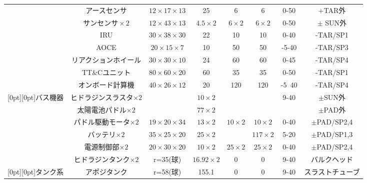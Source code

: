 \begin{table}[H]
\begin{tabularx}{55zw}{c|c c c C C C c }
  & アースセンサ & $12 \times 17 \times 13$ & 25 & 6 & 6 & 0-50 & +TAR外\\ 
  & $サンセンサ \times 2$ & $12 \times 43 \times 13$ & $4.5 \times 2$ & $6 \times 2$
  & $6 \times 2$ & 0-50 & $\pm$ SUN外\\ 
  & IRU & $30 \times 38 \times 30$ & 22 & 10 & 10 & 0-40 & -TAR/SP1\\ 
  & AOCE & $20 \times 15 \times 7$ & 10 & 50 & 50 & -5-40 & -TAR/SP3\\ 
  & リアクションホイール & $30 \times 30 \times 10$ & 24 & 60 & 60 & 0-45 & -TAR/SP4 \\ 
  & TT\&Cユニット & $80 \times 60 \times 20$ & 60 & 35 & 35 & 0-50 & -TAR/SP1\\ 
  & オンボード計算機 & $40 \times 26 \times 12$ & 20 & 120 & 120 & -5~40 & -TAR/SP4\\ 
  \raisebox{.5\normalbaselineskip}[0pt][0pt]{バス機器}
  & ヒドラジンスラスタ$\times 2$ &  & $10 \times 2$ &  &  & 9-40 & $\pm$SUN外 \\ 
  & 太陽電池パドル$\times 2$ &  & $77 \times 2$ &  &  &  & $\pm$PAD外 \\ 
  & パドル駆動モータ$\times 2$ & $19 \times 20 \times 34$ & $13 \times 2$ & $10 \times 2$ & $10 \times 2$ & 0-40 & $\pm$PAD/SP2,4 \\ 
  & バッテリ$\times 2$ & $35 \times 25 \times 20$ & $25 \times 2$ &  & $117 \times 2$ & 5-20 & $\pm$PAD/SP1,3  \\ 
  & 電源制御部$\times 2$ & $20 \times 30 \times 20$ & $10 \times 2$ & $25 \times 2$ & $25 \times 2$ & 0-40 & $\pm$PAD/SP2,4\\ \hline

  & ヒドラジンタンク$\times 2$ & r=35(球) & $16.92 \times 2$ & 0 & 0 & 9-40 & バルクヘッド \\ 
  \raisebox{.5\normalbaselineskip}[0pt][0pt]{タンク系}
  & アポジタンク & r=58(球) & 155.1 & 0 & 0 & 9-40 & スラストチューブ \\ \hline

\end{tabularx}
\end{table}
\newpage

